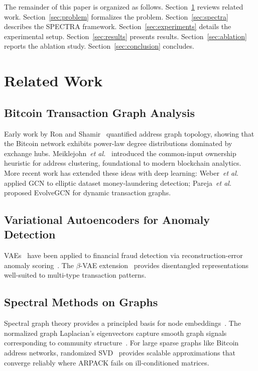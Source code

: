 \documentclass[journal]{IEEEtran}
\newcommand{\spectra}{\textsc{SPECTRA}}
\begin{document}
The remainder of this paper is organized as follows.
Section~\ref{sec:related} reviews related work.
Section~\ref{sec:problem} formalizes the problem.
Section~\ref{sec:spectra} describes the \spectra{} framework.
Section~\ref{sec:experiments} details the experimental setup.
Section~\ref{sec:results} presents results.
Section~\ref{sec:ablation} reports the ablation study.
Section~\ref{sec:conclusion} concludes.

\section{Related Work}
\label{sec:related}

\subsection{Bitcoin Transaction Graph Analysis}
Early work by Ron and Shamir~\cite{Ron2013} quantified address graph topology,
showing that the Bitcoin network exhibits power-law degree distributions
dominated by exchange hubs.
Meiklejohn~\emph{et al.}~\cite{Meiklejohn2013} introduced the common-input
ownership heuristic for address clustering, foundational to modern
blockchain analytics.
More recent work has extended these ideas with deep learning:
Weber~\emph{et al.}~\cite{Weber2019} applied GCN to elliptic dataset
money-laundering detection; Pareja~\emph{et al.}~\cite{Pareja2020} proposed
EvolveGCN for dynamic transaction graphs.

\subsection{Variational Autoencoders for Anomaly Detection}
VAEs~\cite{Kingma2014} have been applied to financial fraud detection
via reconstruction-error anomaly scoring~\cite{Xu2018}.
The $\beta$-VAE extension~\cite{Higgins2017} provides disentangled
representations well-suited to multi-type transaction patterns.

\subsection{Spectral Methods on Graphs}
Spectral graph theory provides a principled basis for node
embeddings~\cite{Belkin2003}.
The normalized graph Laplacian's eigenvectors capture smooth graph
signals corresponding to community structure~\cite{VonLuxburg2007}.
For large sparse graphs like Bitcoin address networks,
randomized SVD~\cite{Halko2011} provides scalable approximations
that converge reliably where ARPACK fails on ill-conditioned matrices.
\end{document}
